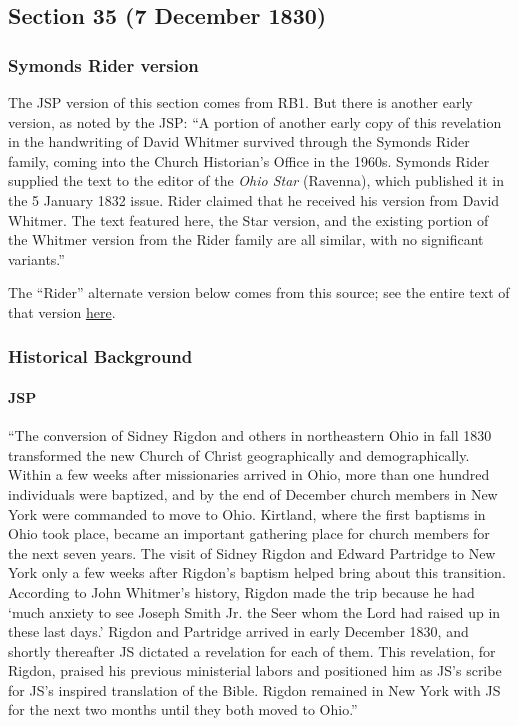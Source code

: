 \subsection{Section 35 (7 December 1830)}
	\label{DC35}
	
	\subsubsection{Symonds Rider version}
	
		The JSP version of this section comes from RB1. But there is another early version, as noted by the JSP: ``A portion of another early copy of this revelation in the handwriting of David Whitmer survived through the Symonds Rider family, coming into the Church Historian's Office in the 1960s. Symonds Rider supplied the text to the editor of the \textit{Ohio Star} (Ravenna), which published it in the 5 January 1832 issue. Rider claimed that he received his version from David Whitmer. The text featured here, the Star version, and the existing portion of the Whitmer version from the Rider family are all similar, with no significant variants.''
		
		The ``Rider'' alternate version below comes from this source; see the entire text of that version \hyperref[EXSS-DC35-RIDER]{here}.
	
	\subsubsection{Historical Background}
		\label{DC35-HB}
		
		\paragraph{JSP}
		
			``The conversion of Sidney Rigdon and others in northeastern Ohio in fall 1830 transformed the new Church of Christ geographically and demographically. Within a few weeks after missionaries arrived in Ohio, more than one hundred individuals were baptized, and by the end of December church members in New York were commanded to move to Ohio. Kirtland, where the first baptisms in Ohio took place, became an important gathering place for church members for the next seven years. The visit of Sidney Rigdon and Edward Partridge to New York only a few weeks after Rigdon's baptism helped bring about this transition. According to John Whitmer's history, Rigdon made the trip because he had `much anxiety to see Joseph Smith Jr. the Seer whom the Lord had raised up in these last days.' Rigdon and Partridge arrived in early December 1830, and shortly thereafter JS dictated a revelation for each of them. This revelation, for Rigdon, praised his previous ministerial labors and positioned him as JS's scribe for JS's inspired translation of the Bible. Rigdon remained in New York with JS for the next two months until they both moved to Ohio.''
			
